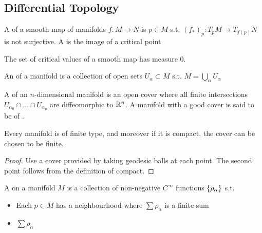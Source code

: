 \documentclass{article}
\begin{document}
\subsection{Differential Topology}

\begin{definition}
	A  of a smooth map of manifolds $f:M\to N$ is $p \in M$ s.t. $(f_\ast)_p:T_pM \to T_{f(p)}N$ is not surjective. A  is the image of a critical point
\end{definition}

\begin{theorem}[Sard]
	The set of critical values of a smooth map has measure 0.
\end{theorem}

\begin{definition}
An  of a manifold is a collection of open sets $U_\alpha \subset M$ s.t. $M = \bigcup_\alpha U_\alpha$
\end{definition}

\begin{definition}
	A  of an $n$-dimensional manifold is an open cover where all finite intersections $U_{\alpha_0} \cap \dots \cap U_{\alpha_p}$ are diffeomorphic to $\mathbb{R}^n$. A manifold with a good cover is said to be of . 
\end{definition}

\begin{theorem}
	Every manifold is of finite type, and moreover if it is compact, the cover can be chosen to be finite. 
\end{theorem}
\begin{proof}
	Use a cover provided by taking geodesic balls at each point. The second point follows from the definition of compact.
\end{proof}

\begin{definition}
	A  on a manifold $M$ is a collection of non-negative $C^\infty$ functions $\left\{ \rho_\alpha \right\}$ s.t. 
	\begin{itemize}
		\item Each $p \in M$ has a neighbourhood where $\sum \rho_\alpha$ is a finite sum
		\item $\sum \rho_\alpha$
	\end{itemize}
\end{definition}
\end{document}
